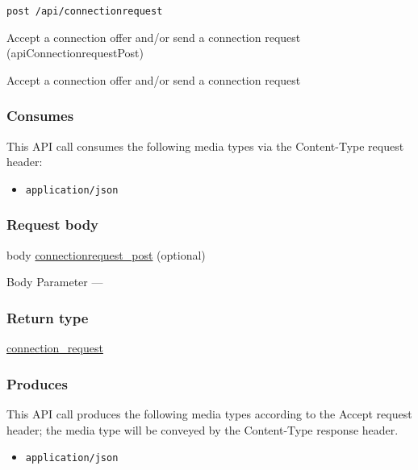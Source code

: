 \begin{verbatim}
post /api/connectionrequest
\end{verbatim}

Accept a connection offer and/or send a connection request
({apiConnectionrequestPost})

Accept a connection offer and/or send a connection request

\hypertarget{consumes-16}{%
\subsubsection{Consumes}\label{consumes-16}}

This API call consumes the following media types via the {Content-Type}
request header:

\begin{itemize}
\tightlist
\item
  \texttt{application/json}
\end{itemize}

\hypertarget{request-body-16}{%
\subsubsection{Request body}\label{request-body-16}}

body \protect\hyperlink{connectionrequest_post}{connectionrequest\_post}
(optional)

{Body Parameter} ---

\hypertarget{return-type-44}{%
\subsubsection{Return type}\label{return-type-44}}

\protect\hyperlink{connection_request}{connection\_request}

\hypertarget{produces-55}{%
\subsubsection{Produces}\label{produces-55}}

This API call produces the following media types according to the
{Accept} request header; the media type will be conveyed by the
{Content-Type} response header.

\begin{itemize}
\tightlist
\item
  \texttt{application/json}
\end{itemize}

